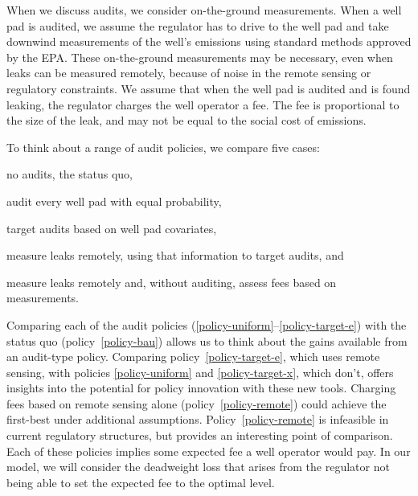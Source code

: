 When we discuss audits, we consider on-the-ground measurements.
When a well pad is audited, we assume the regulator has to drive to the well pad and take downwind measurements of the well's emissions using standard methods approved by the \gls{EPA}.
These on-the-ground measurements may be necessary, even when leaks can be measured remotely, because of noise in the remote sensing or regulatory constraints.
We assume that when the well pad is audited and is found leaking, the regulator charges the well operator a fee.
The fee is proportional to the size of the leak, and may not be equal to the social cost of emissions.

To think about a range of audit policies, we compare five cases:

\begin{auditpolicy}
\label{policy-bau}
no audits, the status quo,
\end{auditpolicy}
\begin{auditpolicy}
\label{policy-uniform}
audit every well pad with equal probability,
\end{auditpolicy}
\begin{auditpolicy}
\label{policy-target-x}
target audits based on well pad covariates,
\end{auditpolicy}
\begin{auditpolicy}
\label{policy-target-e}
measure leaks remotely, using that information to target audits, and
\end{auditpolicy}
\begin{auditpolicy}
\label{policy-remote}
measure leaks remotely and, without auditing, assess fees based on measurements.
\end{auditpolicy}

Comparing each of the audit policies (\ref{policy-uniform}--\ref{policy-target-e})
with the status quo (policy~\ref{policy-bau}) allows us to think about the gains available from an audit-type policy.
Comparing policy~\ref{policy-target-e}, which uses remote sensing, with policies \ref{policy-uniform} and \ref{policy-target-x}, which don't, offers insights into the potential for policy innovation with these new tools.
Charging fees based on remote sensing alone (policy~\ref{policy-remote}) could achieve the first-best under additional assumptions.
Policy~\ref{policy-remote} is infeasible in current regulatory structures, but provides an interesting point of comparison.
Each of these policies implies some expected fee a well operator would pay.
In our model, we will consider the deadweight loss that arises from the regulator not being able to set the expected fee to the optimal level.

